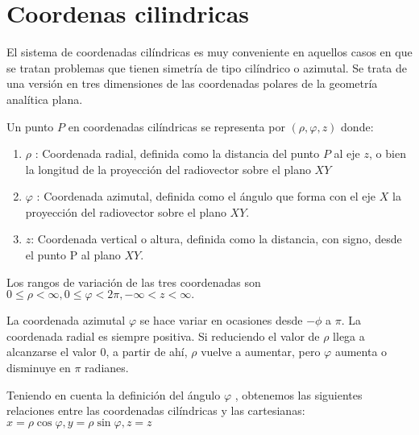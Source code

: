 \section{Coordenas cilindricas}

El sistema de coordenadas cilíndricas es muy conveniente en aquellos casos en que se tratan problemas que tienen simetría de tipo cilíndrico o azimutal. Se trata de una versión en tres dimensiones de las coordenadas polares de la geometría analítica plana.

Un punto $P$ en coordenadas cilíndricas se representa por $(\rho ,\varphi ,z)$ donde:
\begin{enumerate}
  \item $\rho$ : Coordenada radial, definida como la distancia del punto $P$ al eje $z$, o bien la longitud de la proyección del radiovector sobre el plano $XY$
   \item  $\varphi$ : Coordenada azimutal, definida como el ángulo que forma con el eje $X$ la proyección del radiovector sobre el plano $XY$.
   \item  $z$: Coordenada vertical o altura, definida como la distancia, con signo, desde el punto P al plano $XY$.

\end{enumerate}
Los rangos de variación de las tres coordenadas son $0\leq \rho <\infty, 0\leq \varphi <2\pi, -\infty <z<\infty.$

La coordenada azimutal $\varphi$  se hace variar en ocasiones desde $-\phi$ a $\pi$. La coordenada radial es siempre positiva. Si reduciendo el valor de $\rho$  llega a alcanzarse el valor 0, a partir de ahí, $\rho$  vuelve a aumentar, pero $\varphi$  aumenta o disminuye en $\pi$ radianes.

Teniendo en cuenta la definición del ángulo $\varphi$ , obtenemos las siguientes relaciones entre las coordenadas cilíndricas y las cartesianas: $x=\rho \cos \varphi , y=\rho \sin \varphi ,z=z$


